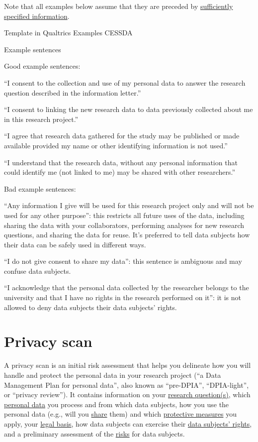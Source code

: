 \documentclass[
]{book}
\begin{document}
Note that all examples below assume that they are preceded by
\protect\hyperlink{privacy-notices}{sufficiently specified information}.

Template in Qualtrics
Examples CESSDA

Example sentences

Good example sentences:

``I consent to the collection and use of my personal data to answer the
research question described in the information letter.''

``I consent to linking the new research data to data previously collected
about me in this research project.''

``I agree that research data gathered for the study may be published or
made available provided my name or other identifying information is not used.''

``I understand that the research data, without any personal information
that could identify me (not linked to me) may be shared with other researchers.''

Bad example sentences:

``Any information I give will be used for this research project only and
will not be used for any other purpose'': this restricts all future uses of
the data, including sharing the data with your collaborators, performing
analyses for new research questions, and sharing the data for reuse. It's
preferred to tell data subjects how their data can be safely used in
different ways.

``I do not give consent to share my data'': this sentence is ambiguous and
may confuse data subjects.

``I acknowledge that the personal data collected by the researcher belongs
to the university and that I have no rights in the research performed on it'':
it is not allowed to deny data subjects their data subjects' rights.

\hypertarget{privacy-scan}{%
\section{Privacy scan}\label{privacy-scan}}

A privacy scan is an initial risk assessment that helps you delineate how you
will handle and protect the personal data in your research project (``a Data
Management Plan for personal data'', also known as ``pre-DPIA'', ``DPIA-light'', or
``privacy review''). It contains information on your
\protect\hyperlink{purpose-limitation}{research question(s)}, which \protect\hyperlink{personal-data}{personal data}
you process and from which data subjects, how you use the personal data (e.g.,
will you \protect\hyperlink{data-sharing-collaboration}{share} them) and which
\protect\hyperlink{design-strategies}{protective measures} you apply, your \protect\hyperlink{legal-basis}{legal basis},
how data subjects can exercise their \protect\hyperlink{data-subject-rights}{data subjects' rights},
and a preliminary assessment of the \protect\hyperlink{risk-assessment}{risks} for data subjects.
\end{document}
